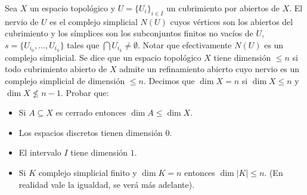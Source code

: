\documentclass[12pt]{article}
\title{\paint{blue}{Topolog\'ia Algebraica}}
\author{\paint{blue}{Guido Arnone}}
\date{}
\newcommand{\paint}[2]{\color{#1}{#2}}
\newenvironment{exercise}[2][Ejercicio]{\begin{trivlist}
\item[\hskip \labelsep \paint{blue}{{\bfseries #1}}\hskip \labelsep {\bfseries #2.}]}{\end{trivlist}}
\begin{document}
\maketitle
\begin{exercise}{3} Sea $X$ un espacio topol\'ogico y $U = \{U_i\}_{i \in I}$ un cubrimiento por abiertos de $X$. El nervio de $U$
es el complejo simplicial $N(U)$ cuyos v\'ertices son los abiertos del cubrimiento y los s\'implices
son los subconjuntos finitos no vac\'ios de $U$, $s = \{U_{i_0}, \dots , U_{i_n} \}$ tales que $\bigcap U_{i_k} \neq \emptyset$. Notar que efectivamente $N(U)$ es un complejo simplicial. Se dice que un espacio topol\'ogico $X$ tiene dimensi\'on $\leq n$ si todo cubrimiento abierto de $X$ admite un refinamiento abierto cuyo nervio es un complejo simplicial de dimensi\'on $\leq n$. Decimos que $\dim X = n$ si $\dim X \leq n$ y $\dim X \not \leq n - 1$. Probar que:
\begin{itemize}
\item[a)] Si $A \subseteq X$ es cerrado entonces $\dim A \leq \dim X$.
\item[b)] Los espacios discretos tienen dimensi\'on $0$.
\item[c)] El intervalo $I$ tiene dimensi\'on $1$.
\item[d)] Si $K$ complejo simplicial finito y $\dim K = n$ entonces $\dim |K| \leq n$. (En realidad vale la igualdad, se ver\'a m\'as adelante).
\end{itemize}
\end{exercise}
\end{document}
